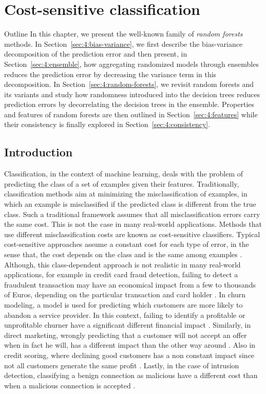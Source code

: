 \chapter{Cost-sensitive classification}

\begin{remark}{Outline}
In this chapter, we present the well-known family of \textit{random forests}
methods. In Section~\ref{sec:4:bias-variance}, we first describe the bias-variance
decomposition of the prediction error and then present, in
Section~\ref{sec:4:ensemble}, how aggregating randomized models through
ensembles reduces the prediction error by decreasing the variance term in this
decomposition. In Section~\ref{sec:4:random-forests}, we revisit random forests
and its variants and study how randomness introduced into the decision trees
reduces prediction errors by decorrelating the decision
trees in the ensemble. Properties and features of random forests are then outlined
in Section~\ref{sec:4:features} while their consistency
is finally explored in Section~\ref{sec:4:consistency}.
\end{remark}


\section{Introduction}
  Classification, in the context of machine learning, deals with the problem of predicting the class
  of a set of examples given their features. Traditionally, classification methods aim at 
  minimizing the misclassification of examples, in which an example is misclassified if the 
  predicted class is different from the true class. Such a traditional framework assumes that all 
  misclassification errors carry the same cost. This is not the case in many real-world 
  applications. Methods that use different misclassification costs are known as cost-sensitive 
  classifiers. Typical cost-sensitive approaches assume a constant cost for each type of error, in 
	the sense that, the cost depends on the class and is the same among examples 
	\citep{Elkan2001,Kim2012}. 
  Although, this class-dependent approach is not realistic in many real-world applications, for 
	example in credit card fraud detection, failing to detect a fraudulent transaction may have an 
  economical impact from a few to thousands of Euros, depending on the particular transaction and 
	card holder \citep{Sahin2013}. In churn modeling, a model is used for predicting which
	customers are more likely to abandon a service provider. In this context, failing to identify a 
	profitable or unprofitable churner have a significant different financial impact 
	\citep{Glady2009}. Similarly, in direct marketing, wrongly predicting that a customer will not 
	accept an offer when in fact he will, has a different impact than the other way around 
	\citep{Zadrozny2003}. Also in credit scoring, where declining good customers has a non constant 
	impact since not all 	customers generate the same profit \citep{Verbraken2014}. Lastly, in the 
	case of intrusion 	detection, classifying a benign connection as malicious have a different cost 
	than when a 	malicious connection is accepted \citep{Ma2011}.


